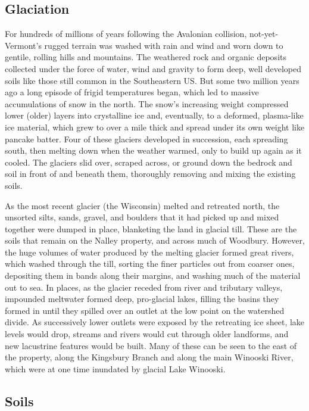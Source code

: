 \documentclass[]{tufte-handout}
\begin{document}
\subsection{Glaciation}\label{glaciation}

For hundreds of millions of years following the Avalonian collision,
not-yet-Vermont's rugged terrain was washed with rain and wind and worn
down to gentile, rolling hills and mountains. The weathered rock and
organic deposits collected under the force of water, wind and gravity to
form deep, well developed soils like those still common in the
Southeastern US. But some two million years ago a long episode of frigid
temperatures began, which led to massive accumulations of snow in the
north. The snow's increasing weight compressed lower (older) layers into
crystalline ice and, eventually, to a deformed, plasma-like ice
material, which grew to over a mile thick and spread under its own
weight like pancake batter. Four of these glaciers developed in
succession, each spreading south, then melting down when the weather
warmed, only to build up again as it cooled. The glaciers slid over,
scraped across, or ground down the bedrock and soil in front of and
beneath them, thoroughly removing and mixing the existing soils.

As the most recent glacier (the Wisconsin) melted and retreated north,
the unsorted silts, sands, gravel, and boulders that it had picked up
and mixed together were dumped in place, blanketing the land in glacial
till. These are the soils that remain on the Nalley property, and across
much of Woodbury. However, the huge volumes of water produced by the
melting glacier formed great rivers, which washed through the till,
sorting the finer particles out from coarser ones, depositing them in
bands along their margins, and washing much of the material out to sea.
In places, as the glacier receded from river and tributary valleys,
impounded meltwater formed deep, pro-glacial lakes, filling the basins
they formed in until they spilled over an outlet at the low point on the
watershed divide. As successively lower outlets were exposed by the
retreating ice sheet, lake levels would drop, streams and rivers would
cut through older landforms, and new lacustrine features would be built.
Many of these can be seen to the east of the property, along the
Kingsbury Branch and along the main Winooski River, which were at one
time inundated by glacial Lake Winooski.

\subsection{Soils}\label{soils}
\end{document}

